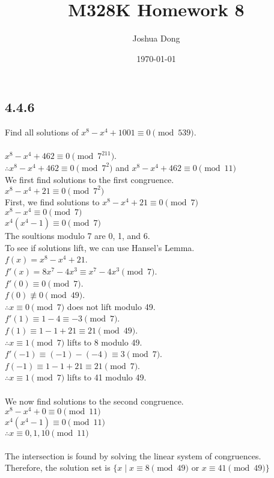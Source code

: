 \documentclass{article}
\begin{document}
\title{M328K\: Homework 8}
\author{Joshua Dong}
\date{\today}
\maketitle



\subsection{4.4.6}
Find all solutions of $x^8-x^4+1001 \equiv 0 \pmod{539}$.
\\
\\$x^8-x^4+462 \equiv 0 \pmod{7^211}$.
\\$\therefore x^8-x^4+462 \equiv 0 \pmod{7^2}$ and
$x^8-x^4+462 \equiv 0 \pmod{11}$
\\We first find solutions to the first congruence.
\\$x^8-x^4+21 \equiv 0 \pmod{7^2}$
\\First, we find solutions to $x^8-x^4+21 \equiv 0 \pmod{7}$
\\$x^8-x^4 \equiv 0 \pmod{7}$
\\$x^4(x^4-1) \equiv 0 \pmod{7}$
\\The soultions modulo 7 are 0, 1, and 6.
\\To see if solutions lift, we can use Hansel's Lemma.
\\$f(x) = x^8-x^4+21$.
\\$f'(x) = 8x^7-4x^3 \equiv x^7-4x^3 \pmod7$.
\\$f'(0) \equiv 0 \pmod7$.
\\$f(0) \not\equiv 0 \pmod{49}$.
\\$\therefore x \equiv 0 \pmod 7$ does not lift modulo 49.
\\$f'(1) \equiv 1-4 \equiv -3 \pmod7$.
\\$f(1) \equiv 1-1+21 \equiv 21 \pmod49$.
\\$\therefore x \equiv 1 \pmod 7$ lifts to 8 modulo 49.
\\$f'(-1) \equiv (-1)-(-4) \equiv 3 \pmod7$.
\\$f(-1) \equiv 1-1+21 \equiv 21 \pmod7$.
\\$\therefore x \equiv 1 \pmod 7$ lifts to 41 modulo 49.
\\
\\We now find solutions to the second congruence.
\\$x^8-x^4+0 \equiv 0 \pmod{11}$
\\$x^4(x^4-1) \equiv 0 \pmod{11}$
\\$\therefore x \equiv 0, 1, 10 \pmod{11}$
\\
\\The intersection is found by solving the linear system of congruences.
\\Therefore, the solution set is $\{x \mid x \equiv 8 \pmod{49}$ or
$x \equiv 41 \pmod{49}\}$
\end{document}
